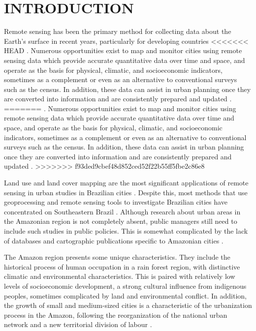 \documentclass[preprint, 3p,
authoryear]{elsarticle} %
\begin{document}
\hypertarget{introduction}{%
\section{INTRODUCTION}\label{introduction}}

Remote sensing has been the primary method for collecting data about the
Earth's surface in recent years, particularly for developing countries
<<<<<<< HEAD
\citep{Zhu2022}. Numerous opportunities exist to map and monitor cities
using remote sensing data which provide accurate quantitative data over
time and space, and operate as the basis for physical, climatic, and
socioeconomic indicators, sometimes as a complement or even as an
alternative to conventional surveys such as the census. In addition,
these data can assist in urban planning once they are converted into
information and are consistently prepared and updated \citep{Weng2018}.
=======
\citep{zhu2022urban}. Numerous opportunities exist to map and monitor
cities using remote sensing data which provide accurate quantitative
data over time and space, and operate as the basis for physical,
climatic, and socioeconomic indicators, sometimes as a complement or
even as an alternative to conventional surveys such as the census. In
addition, these data can assist in urban planning once they are
converted into information and are consistently prepared and updated
\citep{Weng2018}.
>>>>>>> f93ded9cbef48d852ced52f22b55ff5fbe2c86e8

Land use and land cover mapping are the most significant applications of
remote sensing in urban studies in Brazilian cities \citep{Almeida2010}.
Despite this, most methods that use geoprocessing and remote sensing
tools to investigate Brazilian cities have concentrated on Southeastern
Brazil \citep{Santos2022}. Although research about urban areas in the
Amazonian region is not completely absent, public managers still need to
include such studies in public policies. This is somewhat complicated by
the lack of databases and cartographic publications specific to
Amazonian cities \citep{Cardoso2020}.

The Amazon region presents some unique characteristics. They include the
historical process of human occupation in a rain forest region, with
distinctive climatic and environmental characteristics. This is paired
with relatively low levels of socioeconomic development, a strong
cultural influence from indigenous peoples, sometimes complicated by
land and environmental conflict. In addition, the growth of small and
medium-sized cities is a characteristic of the urbanization process in
the Amazon, following the reorganization of the national urban network
and a new territorial division of labour
\citep{Trindade1998, Trindade2011}.
\end{document}
